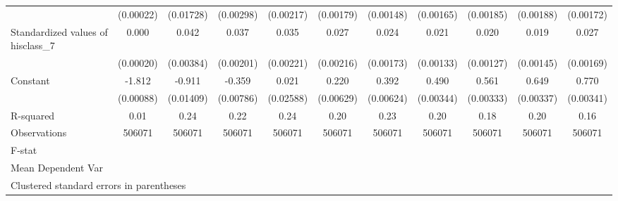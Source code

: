 {\begin{tabular}{l*{10}{c}}
                    &   (0.00022)         &   (0.01728)         &   (0.00298)         &   (0.00217)         &   (0.00179)         &   (0.00148)         &   (0.00165)         &   (0.00185)         &   (0.00188)         &   (0.00172)         \\
Standardized values of hisclass\_7&       0.000         &       0.042\sym{***}&       0.037\sym{***}&       0.035\sym{***}&       0.027\sym{***}&       0.024\sym{***}&       0.021\sym{***}&       0.020\sym{***}&       0.019\sym{***}&       0.027\sym{***}\\
                    &   (0.00020)         &   (0.00384)         &   (0.00201)         &   (0.00221)         &   (0.00216)         &   (0.00173)         &   (0.00133)         &   (0.00127)         &   (0.00145)         &   (0.00169)         \\
Constant            &      -1.812\sym{***}&      -0.911\sym{***}&      -0.359\sym{***}&       0.021         &       0.220\sym{***}&       0.392\sym{***}&       0.490\sym{***}&       0.561\sym{***}&       0.649\sym{***}&       0.770\sym{***}\\
                    &   (0.00088)         &   (0.01409)         &   (0.00786)         &   (0.02588)         &   (0.00629)         &   (0.00624)         &   (0.00344)         &   (0.00333)         &   (0.00337)         &   (0.00341)         \\
\hline
R-squared           &        0.01         &        0.24         &        0.22         &        0.24         &        0.20         &        0.23         &        0.20         &        0.18         &        0.20         &        0.16         \\
Observations        &      506071         &      506071         &      506071         &      506071         &      506071         &      506071         &      506071         &      506071         &      506071         &      506071         \\
F-stat              &                     &                     &                     &                     &                     &                     &                     &                     &                     &                     \\
Mean Dependent Var  &                     &                     &                     &                     &                     &                     &                     &                     &                     &                     \\
\hline\hline
\multicolumn{11}{l}{\footnotesize Clustered standard errors in parentheses}\\
\end{tabular}
}
